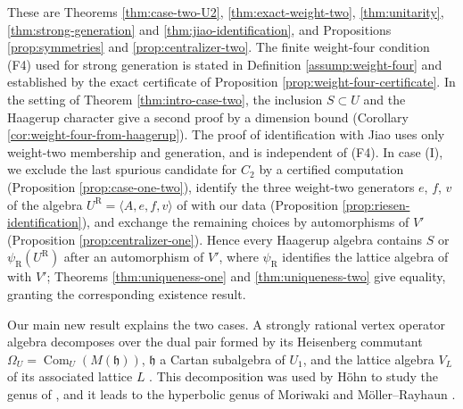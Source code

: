 \documentclass[leqno]{article}
\newcommand{\la}{\langle}
\newcommand{\ra}{\rangle}
\numberwithin{equation}{section}
\begin{document}
These are Theorems \ref{thm:case-two-U2}, \ref{thm:exact-weight-two}, \ref{thm:unitarity}, \ref{thm:strong-generation} and \ref{thm:jiao-identification}, and Propositions \ref{prop:symmetries} and \ref{prop:centralizer-two}. The finite weight-four condition \textup{(F4)} used for strong generation is stated in Definition \ref{assump:weight-four} and established by the exact certificate of Proposition \ref{prop:weight-four-certificate}. In the setting of Theorem \ref{thm:intro-case-two}, the inclusion $S \subset U$ and the Haagerup character give a second proof by a dimension bound (Corollary \ref{cor:weight-four-from-haagerup}). The proof of identification with Jiao uses only weight-two membership and generation, and is independent of \textup{(F4)}. In case (I), we exclude the last spurious candidate for $C_2$ by a certified computation (Proposition \ref{prop:case-one-two}), identify the three weight-two generators $e$, $f$, $v$ of the algebra $U^{\mathrm R} = \la A,e,f,v\ra$ of \cite{Rie26} with our data (Proposition \ref{prop:riesen-identification}), and exchange the remaining choices by automorphisms of $V'$ (Proposition \ref{prop:centralizer-one}). Hence every Haagerup algebra contains $S$ or $\psi_{\mathrm R}(U^{\mathrm R})$ after an automorphism of $V'$, where $\psi_{\mathrm R}$ identifies the lattice algebra of \cite{Rie26} with $V'$; Theorems \ref{thm:uniqueness-one} and \ref{thm:uniqueness-two} give equality, granting the corresponding existence result.

Our main new result explains the two cases. A strongly rational vertex operator algebra decomposes over the dual pair formed by its Heisenberg commutant $\Omega_U = \operatorname{Com}_U(M(\mathfrak h))$, $\mathfrak h$ a Cartan subalgebra of $U_1$, and the lattice algebra $V_L$ of its associated lattice $L$ \cite{Mas14,MoR24a}. This decomposition was used by Höhn \cite{Hoh17} to study the genus of \cite{Hoh03}, and it leads to the hyperbolic genus of Moriwaki \cite{Mor21} and Möller--Rayhaun \cite{MoR24a}.
\end{document}
